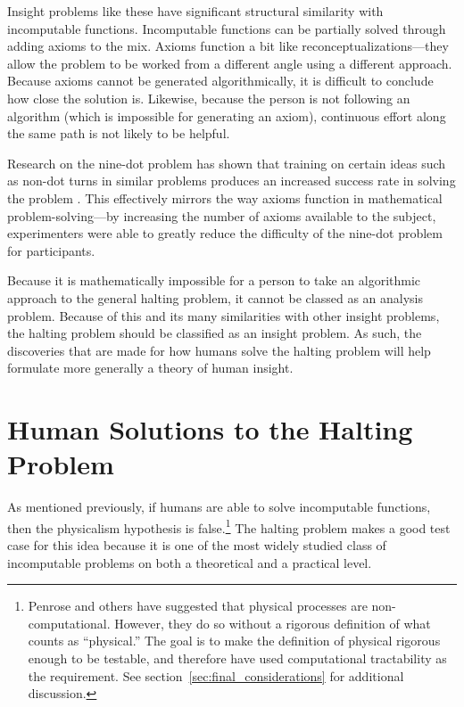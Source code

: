 Insight problems like these have significant structural similarity with incomputable functions.  Incomputable functions can be partially solved through adding axioms to the mix.  Axioms function a bit like reconceptualizations---they allow the problem to be worked from a different angle using a different approach.  Because axioms cannot be generated algorithmically, it is difficult to conclude how close the solution is.  Likewise, because the person is not following an algorithm (which is impossible for generating an axiom), continuous effort along the same path is not likely to be helpful.

Research on the nine-dot problem has shown that training on certain ideas such as non-dot turns in similar problems produces an increased success rate in solving the problem \citep{kershawandohlsson2001, kershaw2004}.  This effectively mirrors the way axioms function in mathematical problem-solving---by increasing the number of axioms available to the subject, experimenters were able to greatly reduce the difficulty of the nine-dot problem for participants.

Because it is mathematically impossible for a person to take an algorithmic approach to the general halting problem, it cannot be classed as an analysis problem.  Because of this and its many similarities with other insight problems, the halting problem should be classified as an insight problem.  As such, the discoveries that are made for how humans solve the halting problem will help formulate more generally a theory of human insight.

\section{Human Solutions to the Halting Problem}

As mentioned previously, if humans are able to solve incomputable functions, then the physicalism hypothesis is false.\footnote{Penrose and others have suggested that physical processes are non-computational.  However, they do so without a rigorous definition of what counts as ``physical.''  The goal is to make the definition of physical rigorous enough to be testable, and therefore have used computational tractability as the requirement.  See section~\ref{sec:final_considerations} for additional discussion.}  The halting problem makes a good test case for this idea because it is one of the most widely studied class of incomputable problems on both a theoretical and a practical level.


